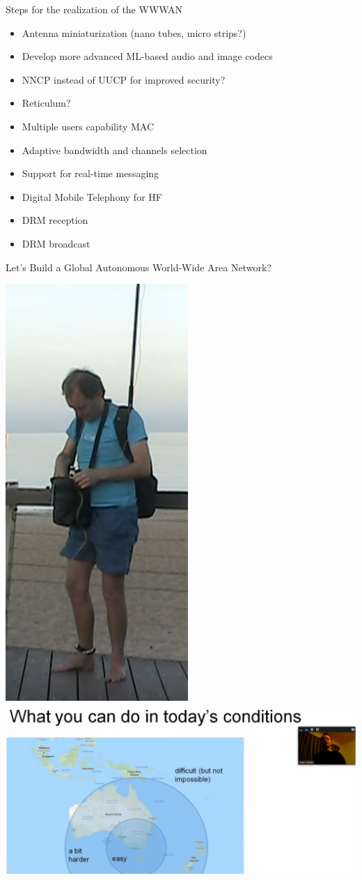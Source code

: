 \documentclass[aspectratio=169,xcolor={x11names,svgnames,dvipsnames}]{beamer}
\begin{document}
\begin{frame}{Steps for the realization of the WWWAN}

  \begin{itemize}
  \item Antenna miniaturization (nano tubes, micro strips?)
  \item Develop more advanced ML-based audio and image codecs
  \item NNCP instead of UUCP for improved security?
  \item Reticulum?
  \item Multiple users capability MAC
  \item Adaptive bandwidth and channels selection
  \item Support for real-time messaging
  \item Digital Mobile Telephony for HF
  \item DRM reception
  \item DRM broadcast
  \end{itemize}

\end{frame}

\begin{frame}{Let's Build a Global Autonomous World-Wide Area Network?}

\begin{center}
  \includegraphics[width=.2\columnwidth]{mobile.png}
  \includegraphics[width=.79\columnwidth]{mobile2.png}

\end{center}


\end{frame}
\end{document}
